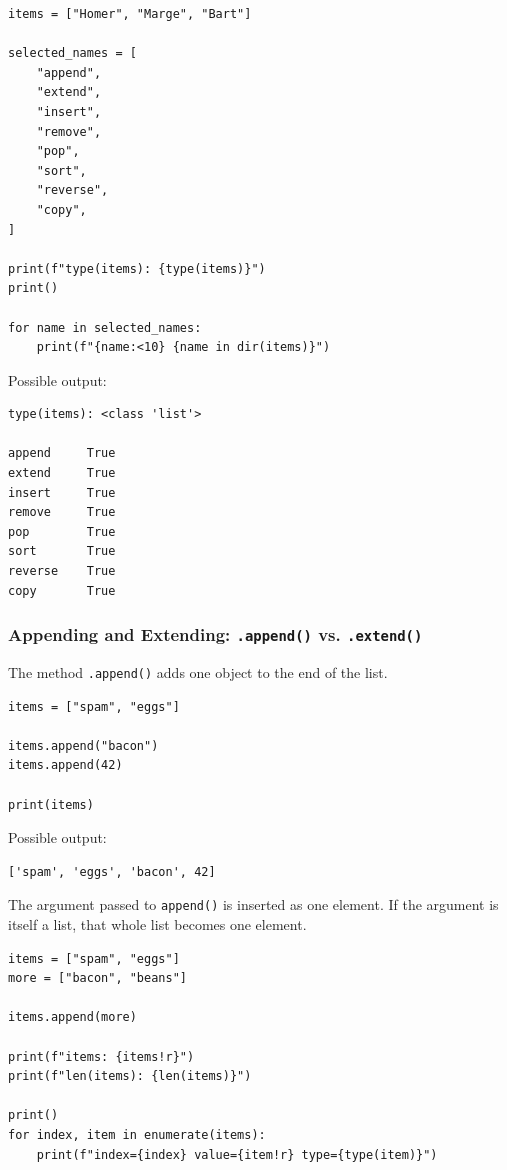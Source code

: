 \begin{verbatim}
items = ["Homer", "Marge", "Bart"]

selected_names = [
    "append",
    "extend",
    "insert",
    "remove",
    "pop",
    "sort",
    "reverse",
    "copy",
]

print(f"type(items): {type(items)}")
print()

for name in selected_names:
    print(f"{name:<10} {name in dir(items)}")
\end{verbatim}

Possible output:

\begin{verbatim}
type(items): <class 'list'>

append     True
extend     True
insert     True
remove     True
pop        True
sort       True
reverse    True
copy       True
\end{verbatim}

\subsubsection{Appending and Extending: \texttt{.append()} vs. \texttt{.extend()}}

The method \texttt{.append()} adds one object to the end of the list.

\begin{verbatim}
items = ["spam", "eggs"]

items.append("bacon")
items.append(42)

print(items)
\end{verbatim}

Possible output:

\begin{verbatim}
['spam', 'eggs', 'bacon', 42]
\end{verbatim}

The argument passed to \texttt{append()} is inserted as one element. If the argument is itself a list, that whole list becomes one element.

\begin{verbatim}
items = ["spam", "eggs"]
more = ["bacon", "beans"]

items.append(more)

print(f"items: {items!r}")
print(f"len(items): {len(items)}")

print()
for index, item in enumerate(items):
    print(f"index={index} value={item!r} type={type(item)}")
\end{verbatim}

